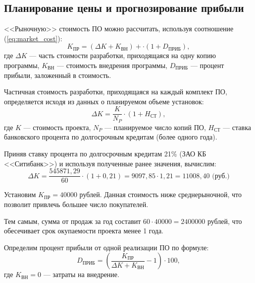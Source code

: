 \subsection{Планирование цены и прогнозирование прибыли} \label{pricing}

<<Рыночную>> стоимость ПО можно рассчитать, используя соотношение (\ref{eq:market_cost}):
\begin{equation}
  \label{eq:market_cost}
K_\textrm{ПР} = (\Delta K + K_\textrm{ВН}) + \cdot (1 + D_\textrm{ПРИБ}),
\end{equation}
где $\Delta K$ --- часть стоимости разработки, приходящаяся на одну копию программы, $K_\textrm{ВН}$ --- стоимость внедрения программы, $D_\textrm{ПРИБ}$ --- процент прибыли, заложенный в стоимость.

\vspace{\baselineskip}
Частичная стоимость разработки, приходящаяся на каждый комплект ПО, определяется исходя из данных о планируемом объеме установок:
\begin{equation}
  \label{eq:item_cost}
\Delta K = \frac {K} {N_P} \cdot (1 + H_\textrm{СТ}),
\end{equation}
где $K$ --- стоимость проекта, $N_P$ --- планируемое число копий ПО, $H_\textrm{СТ}$ --- ставка банковского процента по долгосрочным кредитам (более одного года).

\vspace{\baselineskip}
Приняв ставку процента по долгосрочным кредитам 21\% (ЗАО КБ <<Ситибанк>>) и используя полученные ранее значения, вычислим:
\begin{equation}
  \label{eq:item_cost_calculate}
\Delta K = \frac {545871,29} {60} \cdot (1 + 0,21) = 9097,85 \cdot 1,21 = 11008,40 \textrm{ (руб.)}
\end{equation}

Установим $K_\textrm{ПР} = 40 000$ рублей. Данная стоимость ниже среднерыночной, что позволит привлечь б\textit{о}льшее число покупателей.

\vspace{\baselineskip}
Тем самым, сумма от продаж за год составит $60 \cdot 40 000 = 2400000$ рублей, что обесечивает срок окупаемости проекта менее 1 года.

Определим процент прибыли от одной реализации ПО по формуле:
\begin{equation}
  \label{eq:profit}
D_\textrm{ПРИБ} = (\frac {K_\textrm{ПР}} {\Delta K + K_\textrm{ВН}} - 1) \cdot 100 ,
\end{equation}
где $K_\textrm{ВН} = 0$ --- затраты на внедрение.

